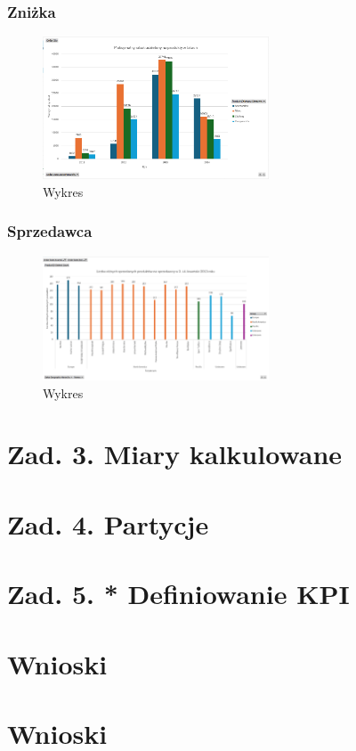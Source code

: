 \documentclass[a4paper,12pt]{article}
\begin{document}
\subsubsection{Zniżka}

\begin{figure}[H]
  \includegraphics[width=0.6\textwidth]{images/max_discount.png}
  \caption{Wykres}
\end{figure}

\subsubsection{Sprzedawca}

\begin{figure}[H]
  \includegraphics[width=0.6\textwidth]{images/sales_salesperson.png}
  \caption{Wykres}
\end{figure}

\section{Zad. 3. Miary kalkulowane}
\section{Zad. 4. Partycje}
\section{Zad. 5. * Definiowanie KPI}
\section{Wnioski}

\section{Wnioski}

\printbibliography
\end{document}
